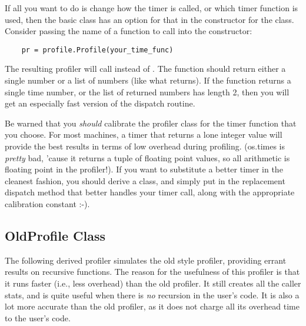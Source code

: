 If all you want to do is change how the timer is called, or which
timer function is used, then the basic class has an option for that in
the constructor for the class.  Consider passing the name of a
function to call into the constructor:

\begin{verbatim}
    pr = profile.Profile(your_time_func)
\end{verbatim}

The resulting profiler will call  instead of
.  The function should return either a single number
or a list of numbers (like what  returns).  If the
function returns a single time number, or the list of returned numbers
has length 2, then you will get an especially fast version of the
dispatch routine.

Be warned that you \emph{should} calibrate the profiler class for the
timer function that you choose.  For most machines, a timer that
returns a lone integer value will provide the best results in terms of
low overhead during profiling.  (os.times is \emph{pretty} bad, 'cause
it returns a tuple of floating point values, so all arithmetic is
floating point in the profiler!).  If you want to substitute a
better timer in the cleanest fashion, you should derive a class, and
simply put in the replacement dispatch method that better handles your
timer call, along with the appropriate calibration constant :-).


\subsection{OldProfile Class}

The following derived profiler simulates the old style profiler,
providing errant results on recursive functions. The reason for the
usefulness of this profiler is that it runs faster (i.e., less
overhead) than the old profiler.  It still creates all the caller
stats, and is quite useful when there is \emph{no} recursion in the
user's code.  It is also a lot more accurate than the old profiler, as
it does not charge all its overhead time to the user's code.

